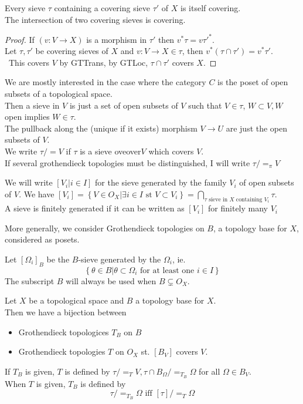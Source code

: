 \documentclass[../main.tex]{subfiles}
\begin{document}
\begin{thm}
	Every sieve $\tau$ containing a covering sieve $\tau'$ of $X$ is itself covering.\\
	The intersection of two covering sieves is covering.
\end{thm}
\begin{proof}
If $( v:V\to X) $ is a morphism in $\tau'$ then $v^{\ast}\tau= v \tau'^{\ast}$.\\
Let $\tau,\tau'$ be covering sieves of $X$ and $v:V\to X\in \tau$, then $v^{\ast }( \tau\cap \tau')= v^{\ast}\tau'$.\\\
This covers $V$ by GTTrans, by GTLoc, $\tau\cap \tau' $ covers $X$.
\end{proof}
\begin{rmq}
We are mostly interested in the case where the category $C$ is the poset of open subsets of a topological space.\\
Then a sieve in $V$ is just a set of open subsets of $V$ such that $V\in \tau$, $W \subset V, W$ open implies $W\in \tau$.\\
The pullback along the (unique if it exists) morphism $V\to U$ are just the open subsets of $V$.\\
We write $\tau /= V$ if $\tau$ is a sieve oveover$V$ which covers $V$.\\
If several grothendieck topologies must be distinguished, I will write $\tau /=_\pi V$ 
\end{rmq}
\begin{defn}
We will write $ [ V_i | i \in I ] $ for the sieve generated by the family $V_i$ of open subsets of $V$.
We have $ [ V_i] = \left\{ V\in O_X| \exists i \in I \text{ st } V \subset V_i \right\} =\bigcap_{\tau \text{ sieve in  } X \text{ containing  } V_i} \tau  $.\\
A sieve is finitely generated if it can be written as $ [ V_i] $ for finitely many $V_i$ 
\end{defn}
\begin{rmq}
More generally, we consider Grothendieck topologies on $B$, a topology base for $X$, considered as posets.
\end{rmq}
\begin{defn}
	Let $ [ \Omega_i]_B$ be the $B$-sieve generated by the $\Omega_i$, ie.
	\[ 
	\left\{ \theta\in B |\theta \subset \Omega_i \text{ for at least one  } i \in I\right\} 
	\]
The subscript $B$ will always be used when $B \subsetneq O_X$.	
\end{defn}
\begin{propo}
	Let $X$ be a topological space and $B$  a topology base for $X$.\\
	Then we have a bijection between
	\begin{itemize}
	\item Grothendieck topologices $T_B$ on $B$ 
	\item Grothendieck topologies $T$ on $O_X$ st. $[B_V]$ covers $V$.
	\end{itemize}
	If $T_B$ is given, $T$ is defined by $\tau /=_T V, \tau\cap B_\Omega /=_{T_B} \Omega$ for all $\Omega \in B_V$.\\
	When $T$ is given, $T_B$ is defined by
	\[ 
	\tau /=_{T_B} \Omega \text{ iff }  [ \tau] /=_T \Omega
	\]
\end{propo}
\end{document}
